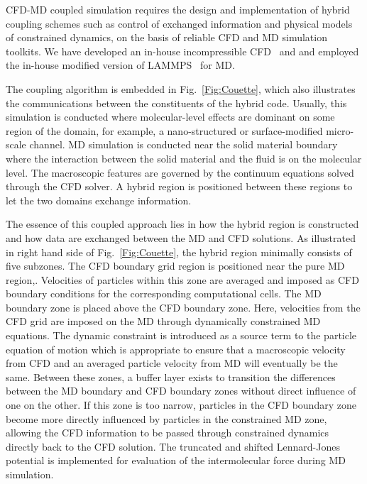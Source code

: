 \documentclass[conference,final]{IEEEtran}
\begin{document}
CFD-MD coupled simulation requires the design and implementation of hybrid coupling schemes such as control of exchanged information and physical models of constrained dynamics, on the basis of reliable CFD and MD simulation toolkits. We have developed an in-house incompressible CFD~\cite{Lee} and and employed the in-house modified version of LAMMPS~\cite{LAMMPS} for MD. 

The coupling algorithm is embedded in Fig.~\ref{Fig:Couette}, which also illustrates the communications between the constituents of the hybrid code. Usually, this simulation is conducted where molecular-level effects are dominant on some region of the domain, for example, a nano-structured or surface-modified micro-scale channel. MD simulation is conducted near the solid material boundary where the interaction between the solid material and the fluid is on the molecular level. The macroscopic features are governed by the continuum equations solved through the CFD solver. A hybrid region is positioned between these regions to let the two domains exchange information.

The essence of this coupled approach lies in how the hybrid region is constructed and how data are exchanged between the MD and CFD solutions. As illustrated in right hand side of Fig.~\ref{Fig:Couette}, the hybrid region minimally consists of five subzones. The CFD boundary grid region is positioned near the pure MD region,. Velocities of particles within this zone are averaged and imposed as CFD boundary conditions for the corresponding computational cells. The MD boundary zone is placed above the CFD boundary zone. Here, velocities from the CFD grid are imposed on the MD through dynamically constrained MD equations. The dynamic constraint is introduced as a source term to the particle equation of motion which is appropriate to ensure that a macroscopic velocity from CFD and an averaged particle velocity from MD will eventually be the same. Between these zones, a buffer layer exists to transition the differences between the MD boundary and CFD boundary zones without direct influence of one on the other. If this zone is too narrow, particles in the CFD boundary zone become more directly influenced by particles in the constrained MD zone, allowing the CFD information to be passed through constrained dynamics directly back to the CFD solution. The truncated and shifted Lennard-Jones potential is implemented for evaluation of the intermolecular force during MD simulation.
\end{document}
